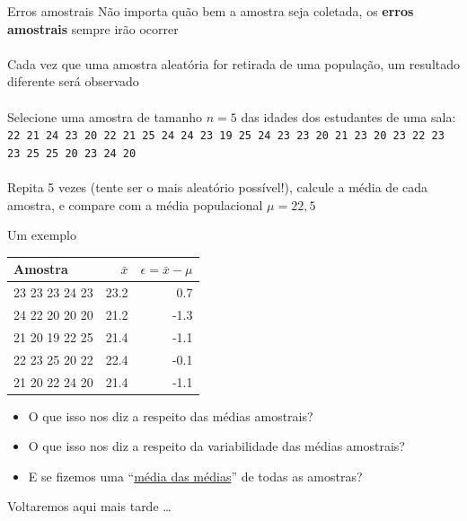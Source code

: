 \documentclass[10pt]{beamer}
\theoremstyle{definition}
\begin{document}
\begin{frame}{Erros amostrais}
  Não importa quão bem a amostra seja coletada, os \textbf{erros
    amostrais} sempre irão ocorrer\\~\\
  Cada vez que uma amostra aleatória for retirada de uma população, um
  resultado diferente será observado\\~\\
  Selecione uma amostra de tamanho $n = 5$ das idades dos estudantes de
  uma sala: \texttt{22 21 24 23 20 22 21 25 24 24 23 19
    25 24 23 23 20 21 23 20 23
    22 23 23 25 25 20 23 24 20}\\~\\
  Repita 5 vezes (tente ser o mais aleatório possível!), calcule a média
  de cada amostra, e compare com a média populacional $\mu = 22,5$
\end{frame}


\begin{frame}{Um exemplo}
  \begin{table}[h]
    \centering
    \begin{tabular}{lrr}
      \hline
      Amostra & $\bar{x}$ & $\epsilon = \bar{x} - \mu$ \\
      \hline
      23 23 23 24 23 & 23.2 & 0.7 \\
      24 22 20 20 20 & 21.2 & -1.3 \\
      21 20 19 22 25 & 21.4 & -1.1 \\
      22 23 25 20 22 & 22.4 & -0.1 \\
      21 20 22 24 20 & 21.4 & -1.1 \\
      \hline
    \end{tabular}
  \end{table}
  \begin{itemize}
  \item O que isso nos diz a respeito das médias amostrais?
  \item O que isso nos diz a respeito da variabilidade das médias
    amostrais?
  \item E se fizemos uma ``\underline{média das médias}'' de todas as
    amostras?
  \end{itemize}
  Voltaremos aqui mais tarde \ldots
\end{frame}
\end{document}
